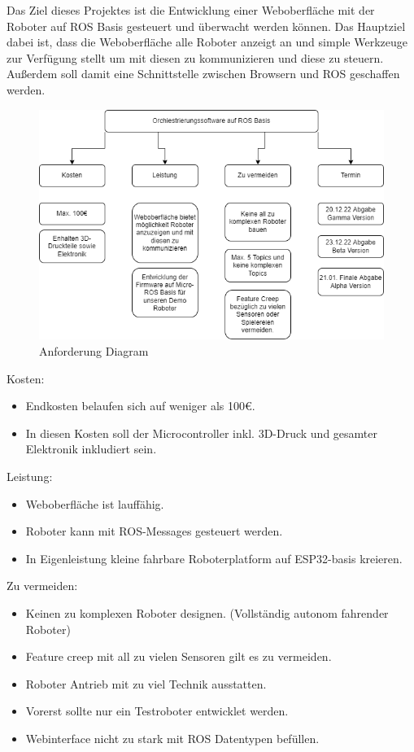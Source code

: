 \begin{flushleft}
    Das Ziel dieses Projektes ist die Entwicklung einer Weboberfläche mit der Roboter auf ROS Basis gesteuert und überwacht werden können.
    Das Hauptziel dabei ist, dass die Weboberfläche alle Roboter anzeigt an und simple Werkzeuge zur Verfügung stellt um mit diesen zu kommunizieren
    und diese zu steuern.
    Außerdem soll damit eine Schnittstelle zwischen Browsern und ROS geschaffen werden.
    

    \begin{figure}[h!]
        \centering
        \includegraphics[width=1\textwidth]{imgs/Zielsetzung.png}
        \caption{Anforderung Diagram}
        \label{fig:dia_anforderung}%
    \end{figure}

    Kosten:
    \begin{itemize}
    \item Endkosten belaufen sich auf weniger als 100€.
    \item In diesen Kosten soll der Microcontroller inkl. 3D-Druck und gesamter Elektronik inkludiert sein.
    \end{itemize}

    Leistung:
    \begin{itemize}
    \item Weboberfläche ist lauffähig.
    \item Roboter kann mit ROS-Messages gesteuert werden.
    \item In Eigenleistung kleine fahrbare Roboterplatform auf ESP32-basis kreieren.
    \end{itemize}
        
    Zu vermeiden:
    \begin{itemize}
    \item Keinen zu komplexen Roboter designen. (Vollständig autonom fahrender Roboter)
    \item Feature creep mit all zu vielen Sensoren gilt es zu vermeiden.
    \item Roboter Antrieb mit zu viel Technik ausstatten.
    \item Vorerst sollte nur ein Testroboter entwicklet werden.
    \item Webinterface nicht zu stark mit ROS Datentypen befüllen.
    \end {itemize}


\end{flushleft}
